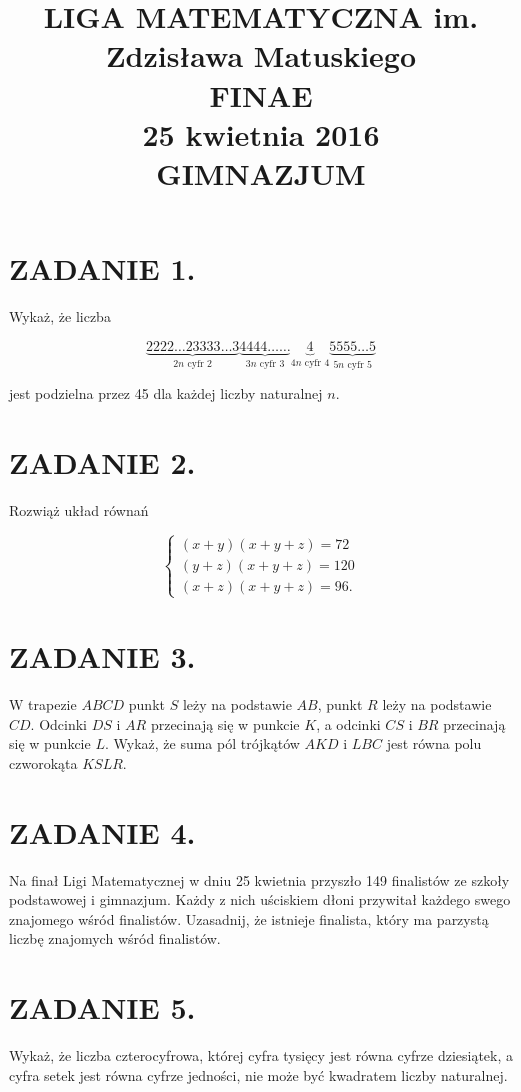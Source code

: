 \documentclass[10pt]{article}
\title{LIGA MATEMATYCZNA im. Zdzisława Matuskiego \\
 FINAE \\
 25 kwietnia 2016 \\
 GIMNAZJUM }
\author{}
\date{}
\begin{document}
\maketitle
\section*{ZADANIE 1.}
Wykaż, że liczba

\[
\underbrace{2222 \ldots 23333 \ldots 3}_{2 n \text { cyfr } 2} \underbrace{4444 \ldots \ldots}_{3 n \text { cyfr } 3} \underbrace{4}_{4 n \text { cyfr } 4} \underbrace{5555 \ldots 5}_{5 n \text { cyfr } 5}
\]

jest podzielna przez 45 dla każdej liczby naturalnej \(n\).

\section*{ZADANIE 2.}
Rozwiąż układ równań

\[
\left\{\begin{array}{l}
(x+y)(x+y+z)=72 \\
(y+z)(x+y+z)=120 \\
(x+z)(x+y+z)=96 .
\end{array}\right.
\]

\section*{ZADANIE 3.}
W trapezie \(A B C D\) punkt \(S\) leży na podstawie \(A B\), punkt \(R\) leży na podstawie \(C D\). Odcinki \(D S\) i \(A R\) przecinają się w punkcie \(K\), a odcinki \(C S\) i \(B R\) przecinają się w punkcie \(L\). Wykaż, że suma pól trójkątów \(A K D\) i \(L B C\) jest równa polu czworokąta \(K S L R\).

\section*{ZADANIE 4.}
Na finał Ligi Matematycznej w dniu 25 kwietnia przyszło 149 finalistów ze szkoły podstawowej i gimnazjum. Każdy z nich uściskiem dłoni przywitał każdego swego znajomego wśród finalistów. Uzasadnij, że istnieje finalista, który ma parzystą liczbę znajomych wśród finalistów.

\section*{ZADANIE 5.}
Wykaż, że liczba czterocyfrowa, której cyfra tysięcy jest równa cyfrze dziesiątek, a cyfra setek jest równa cyfrze jedności, nie może być kwadratem liczby naturalnej.
\end{document}
